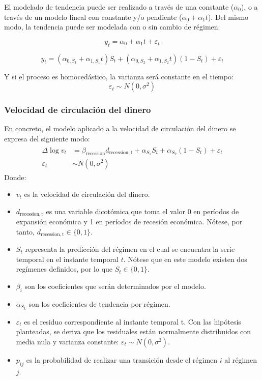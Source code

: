 \documentclass[titlepage, 12pt]{article}
\begin{document}
El modelado de tendencia puede ser realizado a través de una constante ($\alpha_0$), o a través de un modelo lineal con constante y/o pendiente ($\alpha_0+\alpha_1t$). Del mismo modo, la tendencia puede ser modelada con o sin cambio de régimen:

\begin{equation}
    y_t=\alpha_0+\alpha_1t+\varepsilon_t
\end{equation}

\begin{equation}
    y_t=\left(\alpha_{0,S_1}+\alpha_{1,S_1}t\right)S_t+\left(\alpha_{0,S_2}+\alpha_{1,S_2}t\right)\left(1-S_t\right)+\varepsilon_t
\end{equation}

Y si el proceso es homocedástico, la varianza será constante en el tiempo:
\begin{equation}
    \varepsilon_t\sim N\left(0,\sigma^2\right)
\end{equation}

\subsubsection{Velocidad de circulación del dinero}
En concreto, el modelo aplicado a la velocidad de circulación del dinero se expresa del siguiente modo:
%
\begin{align}
    \begin{split}
        \Delta\log{v_t} & =\beta_{\mathrm{recession}}d_{\mathrm{recession,t}}+\alpha_{S_1}S_t+\alpha_{S_2}\left(1-S_t\right)+\varepsilon_t \\
        \varepsilon_t   & \sim N\left(0,\sigma^2\right)
    \end{split}
    \label{eq:markov-v}
\end{align}
%
Donde:
\begin{itemize}
    \item $v_t$ es la velocidad de circulación del dinero.
    \item $d_{\mathrm{recession,t}}$ es una variable dicotómica que toma el valor 0 en períodos de expansión económica y 1 en períodos de recesión económica. Nótese, por tanto, $d_{\mathrm{recession,t}}\in\{0,1\}$.
    \item $S_t$ representa la predicción del régimen en el cual se encuentra la serie temporal en el instante temporal $t$. Nótese que en este modelo existen dos regímenes definidos, por lo que $S_t\in\{0,1\}$.
    \item $\beta_i$ son los coeficientes que serán determinados por el modelo.
    \item $\alpha_{S_k}$ son los coeficientes de tendencia por régimen.
    \item $\varepsilon_t$ es el residuo correspondiente al instante temporal t. Con las hipótesis planteadas, se deriva que los residuales están normalmente distribuidos con media nula y varianza constante: $\varepsilon_t\sim N\left(0,\sigma^2\right)$.
    \item $p_{ij}$ es la probabilidad de realizar una transición desde el régimen $i$ al régimen $j$.
\end{itemize}
\end{document}
